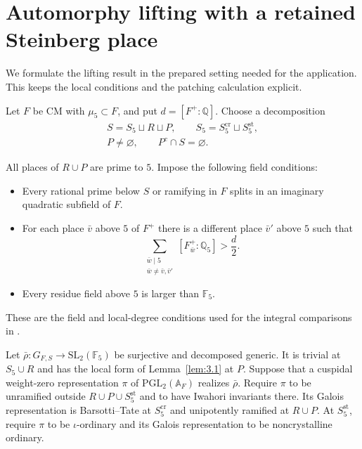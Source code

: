 \documentclass[11pt,a4paper]{article}
\numberwithin{equation}{section}
\begin{document}
\section{Automorphy lifting with a retained Steinberg place}
\label{sec:4}

We formulate the lifting result in the prepared setting needed for the application. This keeps the local conditions and the patching calculation explicit.

Let \(F\) be CM with \(\mu_5\subset F\), and put \(d=[F^+:\mathbb Q]\). Choose a decomposition
\begin{gather*}
S=S_5\sqcup R\sqcup P,\qquad
S_5=S_5^{\mathrm{cr}}\sqcup S_5^{\mathrm{st}},\\
P\ne\varnothing,\qquad P^c\cap S=\varnothing.
\end{gather*}

All places of \(R\cup P\) are prime to \(5\). Impose the following field conditions:
\begin{itemize}
\item Every rational prime below \(S\) or ramifying in \(F\) splits in an imaginary quadratic subfield of \(F\).

\item For each place \(\bar v\) above \(5\) of \(F^+\) there is a different place \(\bar v'\) above \(5\) such that
\begin{equation*}
\sum_{\substack{\bar w\mid5\\\bar w\ne\bar v,\bar v'}}
[F^+_{\bar w}:\mathbb Q_5]>\frac d2.
\end{equation*}

\item Every residue field above \(5\) is larger than \(\mathbb F_5\).
\end{itemize}

These are the field and local-degree conditions used for the integral comparisons in \cite[\S5.6, (5)--(6)]{CN}.

Let \(\bar\rho:G_{F,S}\to\mathrm{SL}_2(\mathbb F_5)\) be surjective and decomposed generic. It is trivial at \(S_5\cup R\) and has the local form of Lemma~\ref{lem:3.1} at \(P\). Suppose that a cuspidal weight-zero representation \(\pi\) of \(\mathrm{PGL}_2(\mathbb A_F)\) realizes \(\bar\rho\). Require \(\pi\) to be unramified outside \(R\cup P\cup S_5^{\mathrm{st}}\) and to have Iwahori invariants there. Its Galois representation is Barsotti--Tate at \(S_5^{\mathrm{cr}}\) and unipotently ramified at \(R\cup P\). At \(S_5^{\mathrm{st}}\), require \(\pi\) to be \(\iota\)-ordinary and its Galois representation to be noncrystalline ordinary.
\end{document}
